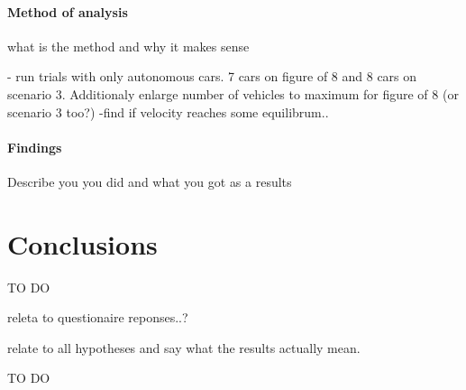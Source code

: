 \documentclass[11pt,english]{article}
\begin{document}
\paragraph{Method of analysis}

what is the method and why it makes sense

- run trials with only autonomous cars. 7 cars on figure of 8 and 8 cars on scenario 3.
Additionaly enlarge number of vehicles to maximum for figure of 8 (or scenario 3 too?)
-find if velocity reaches some equilibrum..

\paragraph{Findings}

Describe you you did and what you got as a results






\section{Conclusions}

TO DO

releta to questionaire reponses..?

relate to all hypotheses and say what the results actually mean.





TO DO


















\end{document}
